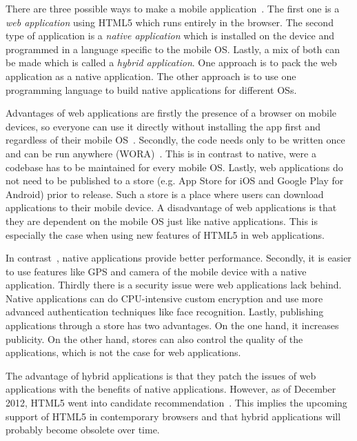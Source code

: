 \documentclass[a4paper]{artikel3}
\begin{document}
There are three possible ways to make a mobile application~\cite{Accenture2012,Hales2012}.
The first one is a \emph{web application} using HTML5 which runs entirely in the browser.
The second type of application is a \emph{native application} which is installed on the device and programmed in a language specific to the mobile OS.
Lastly, a mix of both can be made which is called a \emph{hybrid application}.
One approach is to pack the web application as a native application.
The other approach is to use one programming language to build native applications for different OSs.

Advantages of web applications are firstly the presence of a browser on mobile devices, so everyone can use it directly without installing the app first and regardless of their mobile OS~\cite{Accenture2012}.
Secondly, the code needs only to be written once and can be run anywhere (WORA)~\cite{Hales2012}.
This is in contrast to native, were a codebase has to be maintained for every mobile OS.
Lastly, web applications do not need to be published to a store (e.g. App Store for iOS and Google Play for Android) prior to release.
Such a store is a place where users can download applications to their mobile device.
A disadvantage of web applications is that they are dependent on the mobile OS just like native applications.
This is especially the case when using new features of HTML5 in web applications.

In contrast~\cite{Accenture2012}, native applications provide better performance.
Secondly, it is easier to use features like GPS and camera of the mobile device with a native application.
Thirdly there is a security issue were web applications lack behind. 
Native applications can do CPU-intensive custom encryption and use more advanced authentication techniques like face recognition.
Lastly, publishing applications through a store has two advantages.
On the one hand, it increases publicity.
On the other hand, stores can also control the quality of the applications, which is not the case for web applications.

The advantage of hybrid applications is that they patch the issues of web applications with the benefits of native applications.
However, as of December 2012, HTML5 went into candidate recommendation~\cite{Jacobs2012}.
This implies the upcoming support of HTML5 in contemporary browsers and that hybrid applications will probably become obsolete over time.

\end{document}

